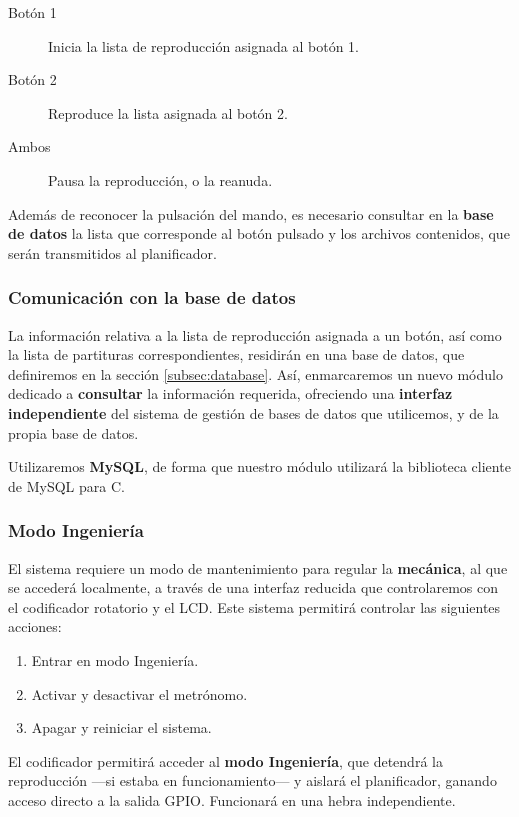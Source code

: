 \documentclass[10pt,a4paper]{article}
\begin{document}
	\begin{description}
		\item[Botón 1] Inicia la lista de reproducción asignada al botón 1.
		\item[Botón 2] Reproduce la lista asignada al botón 2.
		\item[Ambos] Pausa la reproducción, o la reanuda.
	\end{description}
	
	Además de reconocer la pulsación del mando, es necesario consultar en la \textbf{base de datos} la lista que corresponde al botón pulsado y los archivos contenidos, que serán transmitidos al planificador.
	
	\subsubsection*{Comunicación con la base de datos}
	
	La información relativa a la lista de reproducción asignada a un botón, así como la lista de partituras correspondientes, residirán en una base de datos, que definiremos en la sección \ref{subsec:database}. Así, enmarcaremos un nuevo módulo dedicado a \textbf{consultar} la información requerida, ofreciendo una \textbf{interfaz independiente} del sistema de gestión de bases de datos que utilicemos, y de la propia base de datos.
	
	Utilizaremos \textbf{MySQL}, de forma que nuestro módulo utilizará la biblioteca cliente de MySQL para C.
	
	\subsubsection*{Modo Ingeniería}
	
	El sistema requiere un modo de mantenimiento para regular la \textbf{mecánica}, al que se accederá localmente, a través de una interfaz reducida que controlaremos con el codificador rotatorio y el LCD. Este sistema permitirá controlar las siguientes acciones:
	
	\begin{enumerate}
		\item Entrar en modo Ingeniería.
		\item Activar y desactivar el metrónomo.
		\item Apagar y reiniciar el sistema.
	\end{enumerate}
	
	El codificador permitirá acceder al \textbf{modo Ingeniería}, que detendrá la reproducción ---si estaba en funcionamiento--- y  aislará el planificador, ganando acceso directo a la salida GPIO. Funcionará en una hebra independiente.
	
\end{document}
